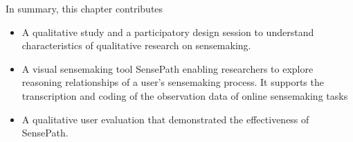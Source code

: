 
In summary, this chapter contributes
\begin{itemize}
\item A qualitative study and a participatory design session to understand characteristics of qualitative research on sensemaking.
\item A visual sensemaking tool SensePath enabling researchers to explore reasoning relationships of a user's sensemaking process. It supports the transcription and coding of the observation data of online sensemaking tasks
\item A qualitative user evaluation that demonstrated the effectiveness of SensePath.
\end{itemize}